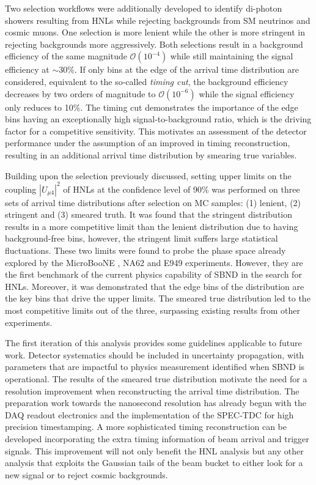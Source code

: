 Two selection workflows were additionally developed to identify di-photon showers resulting from HNLs while rejecting backgrounds from SM neutrinos and cosmic muons.
One selection is more lenient while the other is more stringent in rejecting backgrounds more aggressively.
Both selections result in a background efficiency of the same magnitude $\mathcal{O}(10^{-4})$ while still maintaining the signal efficiency at $\sim$30\%.
If only bins at the edge of the arrival time distribution are considered, equivalent to the so-called \textit{timing cut}, the background efficiency decreases by two orders of magnitude to $\mathcal{O}(10^{-6})$ while the signal efficiency only reduces to 10\%. 
The timing cut demonstrates the importance of the edge bins having an exceptionally high signal-to-background ratio, which is the driving factor for a competitive sensitivity.
This motivates an assessment of the detector performance under the assumption of an improved in timing reconstruction, resulting in an additional arrival time distribution by smearing true variables.

Building upon the selection previously discussed, setting upper limits on the coupling $|U_{\mu4}|^2$ of HNLs at the confidence level of 90\% was performed on three sets of arrival time distributions after selection on MC samples: (1) lenient, (2) stringent and (3) smeared truth.  
It was found that the stringent distribution results in a more competitive limit than the lenient distribution due to having background-free bins, however, the stringent limit suffers large statistical fluctuations.
These two limits were found to probe the phase space already explored by the MicroBooNE \cite{uboone1, uboone2, uboone3}, NA62 \cite{NA62A, NA62B} and E949 \cite{E949} experiments.
However, they are the first benchmark of the current physics capability of SBND in the search for HNLs.
Moreover, it was demonstrated that the edge bins of the distribution are the key bins that drive the upper limits.   
The smeared true distribution led to the most competitive limits out of the three, surpassing existing results from other experiments.  

The first iteration of this analysis provides some guidelines applicable to future work.
Detector systematics should be included in uncertainty propagation, with parameters that are impactful to physics measurement identified when SBND is operational.
The results of the smeared true distribution motivate the need for a resolution improvement when reconstructing the arrival time distribution.
The preparation work towards the nanosecond resolution has already begun with the DAQ readout electronics and the implementation of the SPEC-TDC for high precision timestamping.  
A more sophisticated timing reconstruction can be developed incorporating the extra timing information of beam arrival and trigger signals.
This improvement will not only benefit the HNL analysis but any other analysis that exploits the Gaussian tails of the beam bucket to either look for a new signal or to reject cosmic backgrounds.

